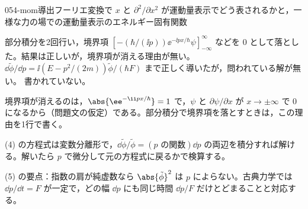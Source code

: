 \documentclass[uplatex,dvipdfmx,a4paper,11pt]{jsarticle}
\begin{document}
\begin{mondai}{054-mom}{導出}{フーリエ変換で $x$ と $\partial^{2}/\partial x^{2}$ が運動量表示でどう表されるかと，一様な力の場での運動量表示のエネルギー固有関数}
\begin{kotaeran}
   部分積分を2回行い，境界項 $[-(\hbar/(\ii p))\ee^{-\ii px/\hbar}\psi]_{-\infty}^{\infty}$ などを $0$ として落とした。結果は正しいが，境界項が消える理由が無い。
   $\dd\tilde{\phi}/\dd p=\ii(E-p^{2}/(2m))\tilde{\phi}/(\hbar F)$ まで正しく導いたが，問われている解が無い。
   書かれていない。
\end{kotaeran}
\begin{rikai}
  \item 境界項が消えるのは，$\abs{\ee^{-\ii px/\hbar}}=1$ で，$\psi$ と $\partial\psi/\partial x$ が $x\to\pm\infty$ で $0$ になるから（問題文の仮定）である。部分積分で境界項を落とすときは，この理由を1行で書く。
  \item (4) の方程式は変数分離形で，$\dd\tilde{\phi}/\tilde{\phi}=(\text{$p$ の関数})\dd p$ の両辺を積分すれば解ける。解いたら $p$ で微分して元の方程式に戻るかで検算する。
  \item (5) の要点：指数の肩が純虚数なら $\abs{\tilde{\phi}}^{2}$ は $p$ によらない。古典力学では $\dd p/\dd t=F$ が一定で，どの幅 $\dd p$ にも同じ時間 $\dd p/F$ だけとどまることと対応する。
\end{rikai}
\end{mondai}
\end{document}
